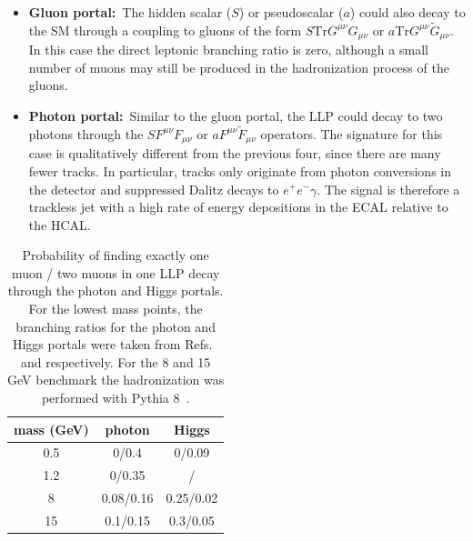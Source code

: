 \begin{itemize}
\item {\bf Gluon portal:}~The hidden scalar ($S$) or pseudoscalar ($a$) could also decay to the SM through a coupling to gluons of the form $S \mathrm{Tr}G^{\mu\nu}G_{\mu\nu}$ or $a \mathrm{Tr}G^{\mu\nu}\tilde G_{\mu\nu}$. In this case the direct leptonic branching ratio is zero, although a small number of muons may still be produced in the hadronization process of the gluons.

\item {\bf Photon portal:}~Similar to the gluon portal, the LLP could decay to two photons through the $S F^{\mu\nu}F_{\mu\nu}$ or $a F^{\mu\nu}\tilde F_{\mu\nu}$ operators. The signature for this case is qualitatively different from the previous four, since there are many fewer tracks. In particular, tracks only originate from photon conversions in the detector and suppressed Dalitz decays to $e^+e^-\gamma$. The signal is therefore a trackless jet with a high rate of energy depositions in the ECAL relative to the HCAL.
\end{itemize}

\begin{table}[h]\centering
\begin{tabular}{|c|cc|}\hline
mass (GeV)  &photon &Higgs  \\\hline
0.5&0/0.4&0/0.09\\
1.2&0/0.35&/\\
8&0.08/0.16&0.25/0.02\\
15&0.1/0.15&0.3/0.05\\\hline
\end{tabular}
\caption{Probability of finding exactly one muon / two muons in one LLP decay through the photon and Higgs portals. For the lowest mass points, the branching ratios for the photon and Higgs portals were taken from Refs.~\cite{Meade:2009rb} and \cite{Fradette:2017sdd} respectively. For the 8 and 15 GeV benchmark the hadronization was performed with Pythia 8~\cite{Sjostrand:2006za,Sjostrand:2007gs}.\label{tab:branchingratios}}
\end{table}

